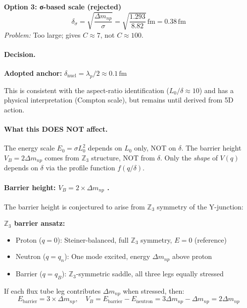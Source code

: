 \begin{tcolorbox}[colback=orange!5!white, colframe=orange!60!black,
                  title={\textbf{$\delta$ Decision Tree: Two Thickness Scales in EDC}}]
\textbf{Option 3: σ-based scale (rejected)}
\begin{equation}
\delta_\sigma = \sqrt{\frac{\Delta m_{np}}{\sigma}} = \sqrt{\frac{1.293}{8.82}}\,\mathrm{fm} = 0.38\,\mathrm{fm}
\end{equation}
\emph{Problem:} Too large; gives $C \approx 7$, not $C \approx 100$.

\paragraph{Decision.}
\textbf{Adopted anchor:} $\delta_{\mathrm{nucl}} = \lambda_p/2 \approx 0.1\,\mathrm{fm}$ \tagI{}

This is consistent with the aspect-ratio identification ($L_0/\delta \approx 10$) and has
a physical interpretation (Compton scale), but remains \tagI{} until derived from 5D action.

\paragraph{What this DOES NOT affect.}
The energy scale $E_0 = \sigma L_0^2$ depends on $L_0$ only, NOT on $\delta$.
The barrier height $V_B = 2\Delta m_{np}$ comes from $\mathbb{Z}_3$ structure, NOT from $\delta$.
Only the \emph{shape} of $V(q)$ depends on $\delta$ via the profile function $f(q/\delta)$.
\end{tcolorbox}

\paragraph{Barrier height: $V_B = 2 \times \Delta m_{np}$ \tagDc{}.}

The barrier height is conjectured to arise from $\mathbb{Z}_3$ symmetry of the Y-junction:

\textbf{$\mathbb{Z}_3$ barrier ansatz:}
\begin{itemize}[nosep]
  \item Proton ($q=0$): Steiner-balanced, full $\mathbb{Z}_3$ symmetry, $E = 0$ (reference)
  \item Neutron ($q=q_n$): One mode excited, energy $\Delta m_{np}$ above proton
  \item Barrier ($q=q_B$): $\mathbb{Z}_3$-symmetric saddle, all three legs equally stressed
\end{itemize}

If each flux tube leg contributes $\Delta m_{np}$ when stressed, then:
\begin{equation}
\label{eq:VB_Z3}
E_{\mathrm{barrier}} = 3 \times \Delta m_{np}, \quad
V_B = E_{\mathrm{barrier}} - E_{\mathrm{neutron}} = 3\Delta m_{np} - \Delta m_{np} = 2\Delta m_{np}
\end{equation}

